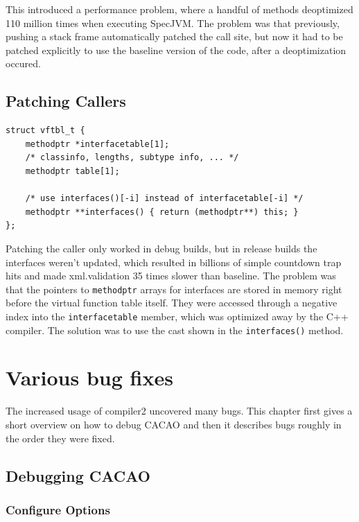 \documentclass[draft,final]{vutinfth} %
\begin{document}
    This introduced a performance problem,
    where a handful of methods deoptimized 110 million times when executing SpecJVM.
    The problem was that previously,
    pushing a stack frame automatically patched the call site,
    but now it had to be patched explicitly
    to use the baseline version of the code,
    after a deoptimization occured.


    \section{Patching Callers}

    \begin{lstlisting}
struct vftbl_t {
    methodptr *interfacetable[1];
    /* classinfo, lengths, subtype info, ... */
    methodptr table[1];

    /* use interfaces()[-i] instead of interfacetable[-i] */
    methodptr **interfaces() { return (methodptr**) this; }
};
    \end{lstlisting}

    Patching the caller only worked in debug builds, but in release builds the interfaces weren't updated,
    which resulted in billions of simple countdown trap hits
    and made xml.validation 35 times slower than baseline.
    The problem was that the pointers to \lstinline{methodptr} arrays for interfaces are
    stored in memory right before the virtual function table itself.
    They were accessed through a negative index into the \lstinline{interfacetable} member,
    which was optimized away by the C++ compiler.
    The solution was to use the cast shown in the \lstinline{interfaces()} method.


    \chapter{Various bug fixes}

    The increased usage of compiler2 uncovered many bugs.
    This chapter first gives a short overview on how to debug CACAO
    and then it describes bugs roughly in the order they were fixed.


    \section{Debugging CACAO}

    \subsection{Configure Options}
\end{document}
